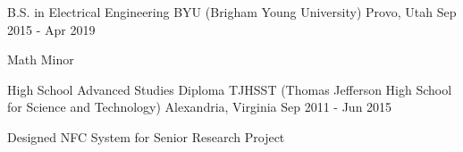 

\begin{cventries}

  \cventry
  {B.S. in Electrical Engineering} %
  {BYU (Brigham Young University)} %
  {Provo, Utah} %
  {Sep 2015 - Apr 2019} %
    {
      \begin{cvitems} %
      \item {Math Minor}
      \end{cvitems}
    }

  \cventry
  {High School Advanced Studies Diploma} %
  {TJHSST (Thomas Jefferson High School for Science and Technology)} %
  {Alexandria, Virginia} %
  {Sep 2011 - Jun 2015} %
    {
      \begin{cvitems} %
      \item {Designed NFC System for Senior Research Project}
      \end{cvitems}
    }

\end{cventries}
